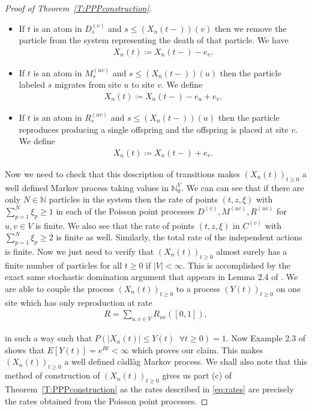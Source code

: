 \documentclass[11pt]{article}
\theoremstyle{definition}
\newcommand{\N}{\mathbb{N}}
\newcommand{\thmref}[1]{Theorem~\ref{T:#1}}
\begin{document}
\begin{proof}[Proof of \thmref{PPPconstruction}]
\begin{itemize}
        \item If $t$ is an atom in $D^{(v)}_{s}$ and $s \leq (X_n(t-))(v)$ then we remove the particle from the system representing the death of that particle. We have
        \begin{align*}
            X_n(t) \coloneqq X_n(t-) - e_v.
        \end{align*}

        \item If $t$ is an atom in $M^{(uv)}_{s}$ and $s \leq (X_n(t-))(u)$ then the particle labeled $s$ migrates from site $u$ to site $v$. We define
        \begin{align*}
            X_n(t) \coloneqq X_n(t-) - e_u + e_v.
        \end{align*}

        \item If $t$ is an atom in $R^{(uv)}_{s}$ and $s \leq (X_n(t-))(u)$ then the particle reproduces producing a single offspring and the offspring is placed at site $v$. We define
        \begin{align*}
            X_n(t) \coloneqq X_n(t-) + e_v.
        \end{align*}
    \end{itemize}

    \noindent Now we need to check that this description of transitions makes $(X_n(t))_{t \geq 0}$ a well defined Markov process taking values in $\N_0^V$. We can can see that if there are only $N \in \N$ particles in the system then the rate of points $(t,z,\xi)$ with $\sum_{p=1}^N \xi_p \geq 1$ in each of the Poisson point processes $D^{(v)}, M^{(uv)}, R^{(uv)}$ for $u,v \in V$ is finite. We also see that the rate of points $(t,z,\xi)$ in $C^{(v)}$ with $\sum_{p=1}^N \xi_p \geq 2$ is finite as well. Similarly, the total rate of the independent actions is finite. Now we just need to verify that $(X_n(t))_{t\geq 0}$ almost surely has a finite number of particles for all $t \geq 0$ if $|V| < \infty$. This is accomplished by the exact same stochastic domination argument that appears in Lemma 2.4 of \cite{CPS2021}. We are able to couple the process $(X_n(t))_{t\geq 0}$ to a process $(Y(t))_{t \geq 0}$ on one site which has only reproduction at rate
    \begin{align*}
        R = \sum_{u,v \in V} R_{uv}([0,1]),
    \end{align*}

    \noindent in such a way such that $P(|X_n(t)| \leq Y(t)\;\; \forall t \geq 0) = 1$. Now Example 2.3 of \cite{CPS2021} shows that $E[Y(t)] = e^{Rt} < \infty$ which proves our claim. This makes $(X_n(t))_{t \geq 0}$ a well defined c\`adl\`ag Markov process. We shall also note that this method of construction of $(X_n(t))_{t \geq 0}$ gives us part (c) of \thmref{PPPconstruction} as the rates described in \eqref{eq:rates} are precisely the rates obtained from the Poisson point processes.
    \medskip
    

\end{proof}
\end{document}
